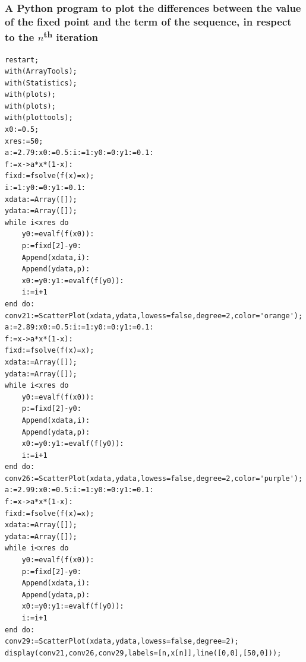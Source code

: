 \documentclass[12pt]{article}
\begin{document}
\subsubsection{A Python program to plot the differences between the value of the fixed point and the term of the sequence, in respect to the $n$\textsuperscript{th} iteration}
\begin{lstlisting}
restart;
with(ArrayTools);
with(Statistics);
with(plots);
with(plots);
with(plottools);
x0:=0.5;
xres:=50;
a:=2.79:x0:=0.5:i:=1:y0:=0:y1:=0.1:
f:=x->a*x*(1-x):
fixd:=fsolve(f(x)=x);
i:=1:y0:=0:y1:=0.1:
xdata:=Array([]);
ydata:=Array([]);
while i<xres do
	y0:=evalf(f(x0)):
	p:=fixd[2]-y0:
	Append(xdata,i):
	Append(ydata,p):
	x0:=y0:y1:=evalf(f(y0)):
	i:=i+1
end do:
conv21:=ScatterPlot(xdata,ydata,lowess=false,degree=2,color='orange');
a:=2.89:x0:=0.5:i:=1:y0:=0:y1:=0.1:
f:=x->a*x*(1-x):
fixd:=fsolve(f(x)=x);
xdata:=Array([]);
ydata:=Array([]);
while i<xres do
	y0:=evalf(f(x0)):
	p:=fixd[2]-y0:
	Append(xdata,i):
	Append(ydata,p):
	x0:=y0:y1:=evalf(f(y0)):
	i:=i+1
end do:
conv26:=ScatterPlot(xdata,ydata,lowess=false,degree=2,color='purple');
a:=2.99:x0:=0.5:i:=1:y0:=0:y1:=0.1:
f:=x->a*x*(1-x):
fixd:=fsolve(f(x)=x);
xdata:=Array([]);
ydata:=Array([]);
while i<xres do
	y0:=evalf(f(x0)):
	p:=fixd[2]-y0:
	Append(xdata,i):
	Append(ydata,p):
	x0:=y0:y1:=evalf(f(y0)):
	i:=i+1
end do:
conv29:=ScatterPlot(xdata,ydata,lowess=false,degree=2);
display(conv21,conv26,conv29,labels=[n,x[n]],line([0,0],[50,0]));
\end{lstlisting}
\end{document}
